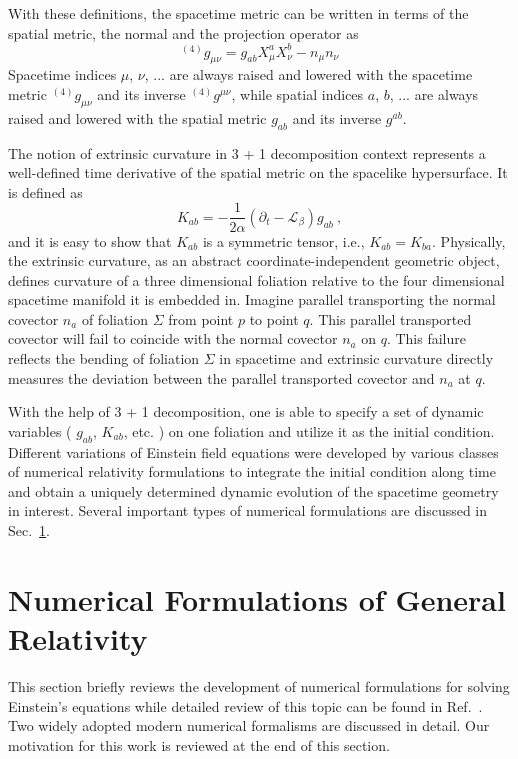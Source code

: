 With these definitions, the spacetime metric can be written in terms of the spatial metric, the normal and the projection operator as
\begin{equation}\label{spacetime metric 3 + 1}
^{\left(4\right)}g_{\mu\nu} = g_{ab}X^{a}_{\mu}X^{b}_{\nu} - n_{\mu}n_{\nu}
\end{equation}
Spacetime indices $\mu$, $\nu$, ... are always raised and lowered with the spacetime metric $^{\left(4\right)}g_{\mu\nu}$ and its inverse $^{\left(4\right)}g^{\mu\nu}$, while spatial indices $a$, $b$, ... are always raised and lowered with the spatial metric $g_{ab}$ and its inverse $g^{ab}$. 

The notion of extrinsic curvature in 3 + 1 decomposition context represents a well-defined time derivative of the spatial metric on the spacelike hypersurface. It is defined as
\begin{equation}\label{extrinsic}
K_{ab} = - \frac{1}{2\alpha}(\partial_{t} - \mathcal{L}_{\beta})g_{ab} \ ,
\end{equation}
and it is easy to show that $K_{ab}$ is a symmetric tensor, i.e., $K_{ab} = K_{ba}$. Physically, the extrinsic curvature, as an abstract coordinate-independent geometric object, defines curvature of a three dimensional foliation relative to the four dimensional spacetime manifold it is embedded in. Imagine parallel transporting the normal covector $n_{a}$ of foliation $\Sigma$ from point $p$ to point $q$. This parallel transported covector will fail to coincide with the normal covector $n_{a}$ on $q$. This failure reflects the bending of foliation $\Sigma$ in spacetime and extrinsic curvature directly measures the deviation between the parallel transported covector and $n_{a}$ at $q$. 

With the help of 3 + 1 decomposition, one is able to specify a set of dynamic variables ( $g_{ab}$, $K_{ab}$, etc. ) on one foliation and utilize it as the initial condition. Different variations of Einstein field equations were developed by various classes of numerical relativity formulations to integrate the initial condition along time and obtain a uniquely determined dynamic evolution of the spacetime geometry in interest. Several important types of  numerical formulations are discussed in Sec.~\ref{numericalformulation}.  

\section{Numerical Formulations of General Relativity}\label{numericalformulation}
This section briefly reviews the development of numerical formulations for solving Einstein's equations while detailed review of this topic can be found in Ref.~\cite{lrr-2012-9}. Two widely adopted modern numerical formalisms are discussed in detail. Our motivation for this work is reviewed at the end of this section. 

